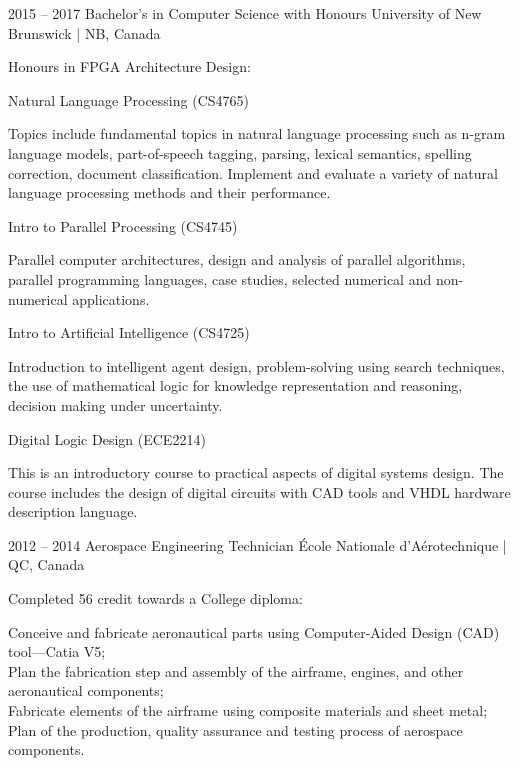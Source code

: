 \documentclass{developercv} %
\begin{document}
\entrys
{2015 -- 2017}
{Bachelor's in Computer Science with Honours}
{University of New Brunswick | NB, Canada}
{Honours in FPGA Architecture Design:
	\begin{tightemize}
		\item Natural Language Processing (CS4765)
		\begin{smallQuote}
			Topics include fundamental topics in natural language processing such as n-gram language models, part-of-speech tagging, parsing, lexical semantics, spelling correction, document classification.
			Implement and evaluate a variety of natural language processing methods and their performance.
		\end{smallQuote}

		\item Intro to Parallel Processing (CS4745)
		\begin{smallQuote}
			Parallel computer architectures, design and analysis of parallel algorithms, parallel programming languages, case studies, selected numerical and non-numerical applications.
		\end{smallQuote}

		\item Intro to Artificial Intelligence (CS4725)
		\begin{smallQuote}
			Introduction to intelligent agent design, problem-solving using search techniques, the use of mathematical logic for knowledge representation and reasoning, decision making under uncertainty.
		\end{smallQuote}

		\item Digital Logic Design (ECE2214)
		\begin{smallQuote}
			This is an introductory course to practical aspects of digital systems design. The course includes the design of digital circuits with CAD tools and VHDL hardware description language.
		\end{smallQuote}
	\end{tightemize}
}

\entrys
{2012 -- 2014}
{Aerospace Engineering Technician}
{École Nationale d'Aérotechnique | QC, Canada}
{Completed 56 credit towards a College diploma:
	\begin{smallQuote}
		Conceive and fabricate aeronautical parts using Computer-Aided Design (CAD) tool---Catia V5;\\
		Plan the fabrication step and assembly of the airframe, engines, and other aeronautical components;\\
		Fabricate elements of the airframe using composite materials and sheet metal;\\
		Plan of the production, quality assurance and testing process of aerospace components.
	\end{smallQuote}
}
\end{document}
